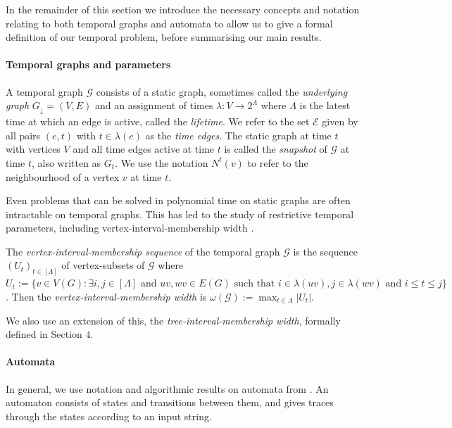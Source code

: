 \documentclass[runningheads]{llncs}
\begin{document}
 

In the remainder of this section we introduce the necessary concepts and notation relating to both temporal graphs and automata to allow us to give a formal definition of our temporal problem, before summarising our main results.

\paragraph*{Temporal graphs and parameters}
A temporal graph $\mathcal{G}$ consists of a static graph, sometimes called the \emph{underlying graph} $G_\downarrow=(V,E)$ and an assignment of times $\lambda:V \rightarrow 2^\Lambda$ where $\Lambda$ is the latest time at which an edge is active, called the \emph{lifetime}. We refer to the set $\mathcal{E}$ given by all pairs $(e,t)$ with $t \in \lambda(e)$ as the \emph{time edges}.
 The static graph at time $t$ with vertices $V$ and all time edges active at time $t$ is called the \emph{snapshot} of $\mathcal{G}$ at time $t$, also written as $G_t$. We use the notation $N^t(v)$ to refer to the neighbourhood of a vertex $v$ at time $t$.

 Even problems that can be solved in polynomial time on static graphs are often intractable on temporal graphs. This has led to the study of restrictive temporal parameters, including vertex-interval-membership width \cite{bumpus2023edge}.

 \begin{definition}
    The \emph{vertex-interval-membership sequence} of the temporal graph $\mathcal{G}$ is the sequence $(U_t)_{t\in[\Lambda]}$ of vertex-subsets of $\mathcal{G}$ where $U_t:=\{v\in V(G):\exists i,j \in [\Lambda] \text{ and } uv,wv \in E(G) \text{ such that }
    i\in \lambda(uv), j\in\lambda(wv) \text{ and } i\leq t\leq j\}$. Then the \emph{vertex-interval-membership width} is $\omega(\mathcal{G}):=\max_{t\in \Lambda}|U_t|$.  
\end{definition}

We also use an extension of this, the \textit{tree-interval-membership width}, formally defined in Section $4$.
 
\paragraph*{Automata}
In general, we use notation and algorithmic results on automata from \cite{esparza2023automata}.   An automaton consists of states and transitions between them, and gives traces through the states according to an input string. 
\end{document}
